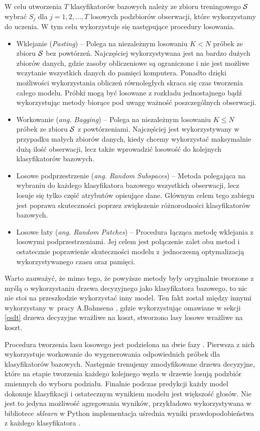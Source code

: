 \documentclass[inzynierska]{pwr_wmat_praca_dyplomowa}
\theoremstyle{plain}
\numberwithin{theorem}{chapter}
\theoremstyle{definition}
\numberwithin{theorem}{chapter}
\begin{document}
W celu utworzenia $T$ klasyfikatorów bazowych należy ze zbioru treningowego $\mathcal{S}$ wybrać $S_j$ dla $j=1,2,\dots,T$ losowych podzbiorów obserwacji, które wykorzystamy do uczenia. W tym celu wykorzystuje się następujące procedury losowania.

\begin{itemize}
	\item Wklejanie (\textit{Pasting}) -- Polega na niezależnym losowaniu $K < N$ próbek ze zbioru $\mathcal{S}$ bez powtórzeń. Najczęściej wykorzystywana jest na bardzo dużych zbiorów danych, gdzie zasoby obliczeniowe są ograniczone i nie jest możliwe wczytanie wszystkich danych do pamięci komputera. Ponadto dzięki możliwości wykorzystania obliczeń równoległych skraca się czas tworzenia całego modelu. Próbki mogą być losowane z rozkładu jednostajnego bądź wykorzystując metody biorące pod uwagę ważność poszczególnych obserwacji. \cite{Pasting}
	\item Workowanie (\textit{ang. Bagging}) -- Polega na niezależnym losowaniu $K \leq N$ próbek ze zbioru $\mathcal{S}$ z powtórzeniami. Najczęściej jest wykorzystywany w przypadku małych zbiorów danych, kiedy chcemy wykorzystać maksymalnie dużą ilość obserwacji, lecz także wprowadzić losowość do kolejnych klasyfikatorów bazowych.
	\item Losowe podprzestrzenie (\textit{ang. Random Subspaces}) -- Metoda polegająca na wybraniu do każdego klasyfikatora bazowego wszystkich obserwacji, lecz losuje się tylko część atrybutów opisujące dane. Głównym celem tego zabiegu jest poprawa skuteczności poprzez zwiększenie różnorodności klasyfikatorów bazowych. \cite{Random_Subspace}
	\item Losowe łaty (\textit{ang. Random Patches}) -- Procedura łącząca metodę wklejania z losowymi podprzestrzeniami. Jej celem jest połączenie zalet obu metod i ostatecznie poprawienie skuteczności modelu z~jednoczesną optymalizacją wykorzystywanego czasu oraz pamięci. \cite{Random_Patches}
\end{itemize}
Warto zauważyć, że mimo tego, że powyższe metody były oryginalnie tworzone z myślą o wykorzystaniu drzewa decyzyjnego jako klasyfikatora bazowego, to nic nie stoi na przeszkodzie wykorzystać inny model. Ten fakt został między innymi wykorzystany w~pracy A.Bahnsena \cite{alej2015ensemble}, gdzie wykorzystując omawiane w sekcji \ref{csdt} drzewa decyzyjne wrażliwe na koszt, stworzono lasy losowe wrażliwe na koszt.

Procedura tworzenia lasu losowego jest podzielona na dwie fazy \cite{Random_Forest}. Pierwsza z nich wykorzystuje workowanie do wygenerowania odpowiednich próbek dla klasyfikatorów bazowych. Następnie trenujemy zmodyfikowane drzewa decyzyjne, które na etapie tworzenia każdego kolejnego węzła w drzewie losują podzbiór zmiennych do wyboru podziału. Finalnie podczas predykcji każdy model dokonuje klasyfikacji i ostatecznym wynikiem modelu jest większość głosów. Nie jest to jedyna możliwość agregowania wyników, przykładowo wykorzystywana w bibliotece \textit{sklearn} w Python implementacja uśrednia wyniki prawdopodobieństwa z każdego klasyfikatora \cite{sklearn_api}.
\end{document}
